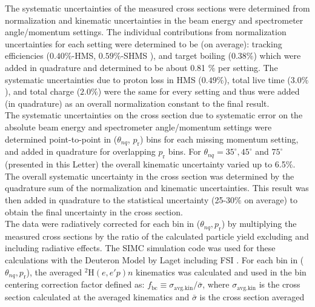 \indent The systematic uncertainties of the measured cross sections were determined from 
normalization and kinematic uncertainties in the beam energy and spectrometer angle/momentum settings. The individual
contributions from normalization uncertainties for each setting were determined to be (on average): tracking efficiencies ($0.40 \%$-HMS, $0.59 \%$-SHMS ),
and target boiling ($0.38 \%$) which were added in quadrature and determined to be about 0.81 $\%$ per setting. The systematic uncertainties due to
proton loss in HMS ($0.49 \%$), total live time ($3.0 \%$), and total charge ($2.0\%$) were the same for every setting and thus were added (in quadrature)
as an overall normalization constant to the final result.\\
\indent The systematic uncertainties on the cross section due to systematic error on the absolute beam energy and spectrometer angle/momentum settings were
determined point-to-point in ($\theta_{nq}$, $p_{\mathrm{r}}$) bins for each missing momentum setting, and added in quadrature for overlapping $p_{\mathrm{r}}$ bins. 
For $\theta_{nq}= 35^{\circ}, 45^{\circ}$ and $75^{\circ}$ (presented in this Letter) the overall kinematic uncertainty varied up to 6.5$\%$.
The overall systematic uncertainty in the cross section was determined by the quadrature sum of the normalization and kinematic uncertainties. This result was then added in quadrature
to the statistical uncertainty (25-30$\%$ on average) to obtain the final uncertainty in the cross section. \\
\indent The data were radiatively corrected for each bin in ($\theta_{nq}, p_{\mathrm{r}}$) by multiplying the measured cross sections by the ratio of the calculated particle yield excluding and including radiative effects. The SIMC simulation code was used for these calculations with the Deuteron Model by Laget including FSI \cite{LAGET2005}.
For each bin in ($\theta_{nq}, p_{\mathrm{r}}$), the averaged $^{2}\mathrm{H}(e,e'p)n$ kinematics was calculated and used in the bin centering correction factor defined as:
$f_{\mathrm{bc}} \equiv \sigma_{\mathrm{avg.kin}} / \bar{\sigma}$, where $\sigma_{\mathrm{avg.kin}}$ is the cross section calculated at the averaged kinematics and $\bar{\sigma}$ is the cross section averaged
